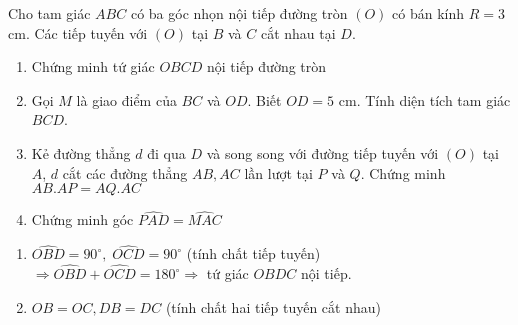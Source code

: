 \begin{bt}%
	Cho tam giác $ABC$ có ba góc nhọn nội tiếp đường tròn $(O)$ có bán kính $R = 3$ cm. Các tiếp tuyến với $(O)$ tại $B$ và $C$ cắt nhau tại $D$.
	\begin{enumerate}
	\item Chứng minh tứ giác $OBCD$ nội tiếp đường tròn
	\item Gọi $M$ là giao điểm của $BC$ và $OD$. Biết $OD = 5$ cm. Tính diện tích tam giác $BCD$.
		\item Kẻ đường thẳng $d$ đi qua $D$ và song song với đường tiếp tuyến với $(O)$ tại $A$, $d$ cắt các đường thẳng $AB, AC$ lần lượt tại $P$ và $Q$. Chứng minh $AB. AP = AQ.AC$
	\item Chứng minh góc $\widehat{PAD}= \widehat{MAC}$
	\end{enumerate}
	\loigiai
	{
\begin{center}
\end{center}
\begin{enumerate}
\item $\widehat{OBD} = 90^\circ ,\;\widehat{OCD} = 90^\circ$ (tính chất tiếp tuyến)\\
$\Rightarrow \widehat{OBD} +\widehat{OCD} = 180^\circ \Rightarrow$ tứ giác $OBDC$ nội tiếp.
\item $OB = OC, DB = DC$ (tính chất hai tiếp tuyến cắt nhau)\\

\end{enumerate}}
\end{bt}
